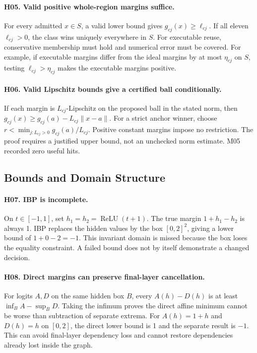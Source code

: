 \paragraph{H05. Valid positive whole-region margins suffice.}
For every admitted $x\in S$, a valid lower bound gives $g_{cj}(x)\ge\ell_{cj}$. If all eleven $\ell_{cj}>0$, the class wins uniquely everywhere in $S$. For executable reuse, conservative membership must hold and numerical error must be covered. For example, if executable margins differ from the ideal margins by at most $\eta_{cj}$ on $S$, testing $\ell_{cj}>\eta_{cj}$ makes the executable margins positive.

\paragraph{H06. Valid Lipschitz bounds give a certified ball conditionally.}
If each margin is $L_{cj}$-Lipschitz on the proposed ball in the stated norm, then $g_{cj}(x)\ge g_{cj}(a)-L_{cj}\|x-a\|$. For a strict anchor winner, choose $r<\min_{j:L_{cj}>0}g_{cj}(a)/L_{cj}$. Positive constant margins impose no restriction. The proof requires a justified upper bound, not an unchecked norm estimate. M05 recorded zero useful hits.

\subsection{Bounds and Domain Structure}
\paragraph{H07. IBP is incomplete.}
On $t\in[-1,1]$, set $h_1=h_2=\operatorname{ReLU}(t+1)$. The true margin $1+h_1-h_2$ is always 1. IBP replaces the hidden values by the box $[0,2]^2$, giving a lower bound of $1+0-2=-1$. This invariant domain is missed because the box loses the equality constraint. A failed bound does not by itself demonstrate a changed decision.

\paragraph{H08. Direct margins can preserve final-layer cancellation.}
For logits $A,D$ on the same hidden box $B$, every $A(h)-D(h)$ is at least $\inf_B A-\sup_B D$. Taking the infimum proves the direct affine minimum cannot be worse than subtraction of separate extrema. For $A(h)=1+h$ and $D(h)=h$ on $[0,2]$, the direct lower bound is 1 and the separate result is $-1$. This can avoid final-layer dependency loss and cannot restore dependencies already lost inside the graph.

